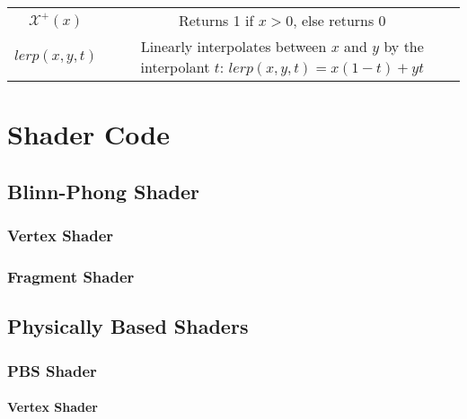 \begin{appendices}
\begin{center}
\begin{tabular}{ c c }
		\begin{math}\mathcal{X}^+(x)\end{math} & Returns 1 if \begin{math}x > 0\end{math}, else returns 0 \\
		\begin{math}lerp(x, y, t)\end{math} & Linearly interpolates between \begin{math}x\end{math} and \begin{math}y\end{math} by the interpolant \begin{math}t\end{math}: \begin{math}lerp(x, y, t) = x(1 - t) + yt\end{math} \\
		\hline
	\end{tabular}
\end{center}

\chapter{Shader Code} \label{ShaderCode}

\section{Blinn-Phong Shader}

\subsection{Vertex Shader}

\subsection{Fragment Shader}

\section{Physically Based Shaders}

\subsection{PBS Shader}

\subsubsection{Vertex Shader}


\end{appendices}
